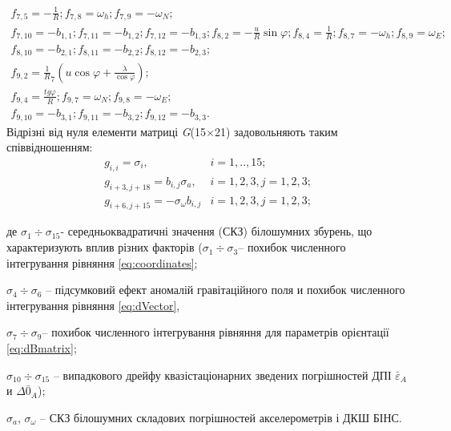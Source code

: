\begin{equation}
\begin{array}{l}
{f_{7,5}=-\frac{1}{R} ;f_{7,8}=\omega_{h}; f_{7,9}=-\omega_{N} ;}\\
{f_{7,10}=-b_{1,1};f_{7,11}=-b_{1,2};f_{7,12}=-b_{1,3} ;} 
{f_{8,2} =-\frac{u}{R} \sin \varphi; f_{8,4} =\frac{1}{R};f_{8,7} =-\omega_{h};f_{8,9} =\omega_{E};}\\
{f_{8,10} =-b_{2,1}; f_{8,11} =-b_{2,2}; f_{8,12} =-b_{2,3} ;}\\ 
{f_{9,2} =\frac{1}{R}_{7} (u\cos \varphi +\frac{\dot{\lambda }}{\cos \varphi });}\\
{f_{9,4} =\frac{tg\varphi }{R}; f_{9,7} =\omega_{N}; f_{9,8} =-\omega_{E};}\\ 
{f_{9,10} =-b_{3,1};f_{9,11} =-b_{3,2};f_{9,12} =-b_{3,3}.}
\end{array}
\end{equation} 
Відрізні від нуля елементи матриці \textit{G}(15$\times $21) задовольняють таким 
співвідношенням:
\begin{equation} 
\label{eq:Gmatrix_} 
\begin{array}{cc} 
g_{i,i} =\sigma_{i},& i=1,..,15; \\ 
g_{i+3,j+18}=b_{i,j} \sigma_{a},& i=1,2,3,j=1,2,3;\\ 
g_{i+6,j+15}=-\sigma_{\omega } b_{i,j} & i=1,2,3,j=1,2,3; 
\end{array} 
\end{equation} 
\begin{ESKDexplanation}
\item де $\sigma_{1} \div \sigma_{15} $- середньоквадратичні значення (СКЗ) білошумних збурень, 
що характеризують вплив різних факторів ($\sigma_{1} \div \sigma_{3} $-- похибок 
численного інтегрування рівняння \eqref{eq:coordinates}; 
\item  $\sigma_{4} \div \sigma_{6} $ --  підсумковий ефект аномалій гравітаційного поля и похибок численного інтегрування 
рівняння \eqref{eq:dVector}, 
\item $\sigma_{7} \div \sigma_{9} $-- похибок численного інтегрування рівняння для параметрів орієнтації \eqref{eq:dBmatrix};  
\item $\sigma_{10} \div \sigma_{15} $ -- випадкового дрейфу квазістаціонарних зведених погрішностей 
ДПІ  $\bar{\varepsilon }_{A} $ и $\Delta \bar{0}_{A} $);
\item $\sigma_{a} $, $\sigma_{\omega } $ -- СКЗ білошумних складових погрішностей акселерометрів і ДКШ БІНС.
\end{ESKDexplanation}

